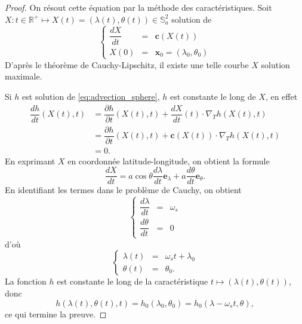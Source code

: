 \begin{proof}
On résout cette équation par la méthode des caractéristiques. Soit $X : t \in \mathbb{R}^+ \mapsto X(t)=(\lambda(t), \theta(t)) \in \mathbb{S}_a^2$ solution de 
\begin{equation}
\left\lbrace
\begin{array}{rcl}
\dfrac{dX}{dt} & = & \mathbf{c}(X(t)) \\
X(0) & = & \mathbf{x}_0 = (\lambda_0, \theta_0)
\end{array}
\right.
\label{eq:cauchy_sphere1}
\end{equation}
D'après le théorème de Cauchy-Lipschitz, il existe une telle courbe $X$ solution maximale.

Si $h$ est solution de \eqref{eq:advection_sphere}, $h$ est constante le long de $X$, en effet
\begin{align*}
\dfrac{dh}{dt}(X(t),t) & = \dfrac{\partial h}{\partial t} (X(t),t) + \dfrac{d X}{dt}(t) \cdot \nabla_T h(X(t),t) \\
& = \dfrac{\partial h}{\partial t} (X(t),t) + \mathbf{c}(X(t)) \cdot \nabla_T h(X(t),t) \\
& = 0.
\end{align*}
En exprimant $X$ en coordonnée latitude-longitude, on obtient la formule
\begin{equation}
\dfrac{dX}{dt} = a \cos \theta \dfrac{d \lambda}{dt} \mathbf{e}_{\lambda} + a \dfrac{d \theta}{d t} \mathbf{e}_{\theta}.
\end{equation}
En identifiant les termes dans le problème de Cauchy, on obtient
\begin{equation}
\left\lbrace
\begin{array}{rcl}
\dfrac{d \lambda}{d t} & = & \omega_s \\
\dfrac{d \theta}{d t}  & = & 0
\end{array}
\right.
\end{equation}
d'où
\begin{equation}
\left\lbrace
\begin{array}{rcl}
\lambda(t) & = & \omega_s t + \lambda_0 \\
\theta(t)  & = & \theta_0.
\end{array}
\right.
\end{equation}
La fonction $h$ est constante le long de la caractéristique $t \mapsto (\lambda(t), \theta(t))$, donc
\begin{equation}
h(\lambda(t), \theta(t), t) = h_0(\lambda_0 , \theta_0 ) = h_0(\lambda - \omega_s t, \theta ),
\end{equation}
ce qui termine la preuve.
\end{proof}

